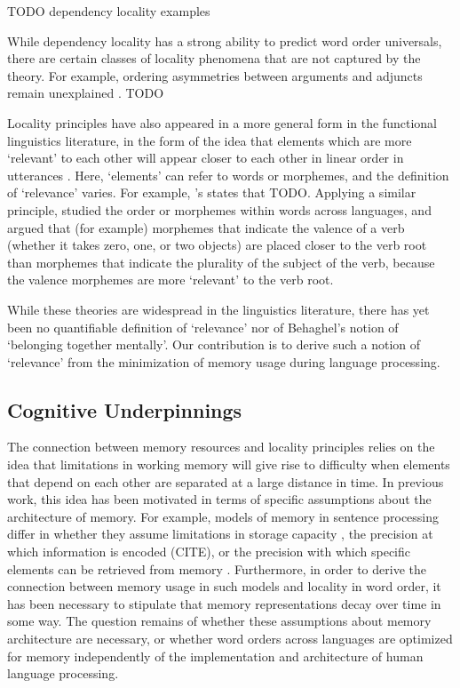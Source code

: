 TODO dependency locality examples

While dependency locality has a strong ability to predict word order universals, there are certain classes of locality phenomena that are not captured by the theory. For example, ordering asymmetries between arguments and adjuncts remain unexplained \citep{}. TODO

Locality principles have also appeared in a more general form in the functional linguistics literature, in the form of the idea that elements which are more `relevant' to each other will appear closer to each other in linear order in utterances \citep{givon1985,givon1991,bybee1985,newmeyer1992}. Here, `elements' can refer to words or morphemes, and the definition of `relevance' varies. For example, \citet{givon1985}'s  states that TODO. Applying a similar principle, \citet{bybee1985morphology} studied the order or morphemes within words across languages, and argued that (for example) morphemes that indicate the valence of a verb (whether it takes zero, one, or two objects) are placed closer to the verb root than morphemes that indicate the plurality of the subject of the verb, because the valence morphemes are more `relevant' to the verb root. 

While these theories are widespread in the linguistics literature, there has yet been no quantifiable definition of `relevance' nor of Behaghel's notion of `belonging together mentally'. Our contribution is to derive such a notion of `relevance' from the minimization of memory usage during language processing.

\subsection{Cognitive Underpinnings}

The connection between memory resources and locality principles relies on the idea that limitations in working memory will give rise to difficulty when elements that depend on each other are separated at a large distance in time. In previous work, this idea has been motivated in terms of specific assumptions about the architecture of memory. For example, models of memory in sentence processing differ in whether they assume limitations in storage capacity \citep{gibson1998linguistic}, the precision at which information is encoded (CITE), or the precision with which specific elements can be retrieved from memory \citep{lewis-activation-based-2005}. Furthermore, in order to derive the connection between memory usage in such models and locality in word order, it has been necessary to stipulate that memory representations decay over time in some way. The question remains of whether these assumptions about memory architecture are necessary, or whether word orders across languages are optimized for memory independently of the implementation and architecture of human language processing.

